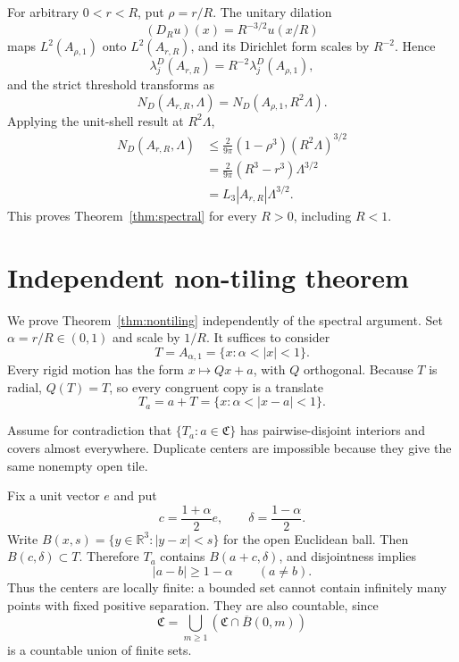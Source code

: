 \documentclass[11pt]{article}
\numberwithin{equation}{section}
\theoremstyle{definition}
\theoremstyle{remark}
\newcommand{\R}{\mathbb R}
\begin{document}
For arbitrary \(0<r<R\), put \(\rho=r/R\).  The unitary dilation
\[
  (D_Ru)(x)=R^{-3/2}u(x/R)
\]
maps \(L^2(A_{\rho,1})\) onto \(L^2(A_{r,R})\), and its Dirichlet form
scales by \(R^{-2}\).  Hence
\[
  \lambda_j^D(A_{r,R})=R^{-2}\lambda_j^D(A_{\rho,1}),
\]
and the strict threshold transforms as
\begin{equation}
  N_D(A_{r,R},\Lambda)
  =N_D(A_{\rho,1},R^2\Lambda).
  \label{eq:dilation-count}
\end{equation}
Applying the unit-shell result at \(R^2\Lambda\),
\[
\begin{aligned}
  N_D(A_{r,R},\Lambda)
  &\le\frac{2}{9\pi}(1-\rho^3)(R^2\Lambda)^{3/2}\\
  &=\frac{2}{9\pi}(R^3-r^3)\Lambda^{3/2}\\
  &=L_3|A_{r,R}|\Lambda^{3/2}.
\end{aligned}
\]
This proves Theorem~\ref{thm:spectral} for every \(R>0\), including
\(R<1\).

\appendix

\section{Independent non-tiling theorem}

We prove Theorem~\ref{thm:nontiling} independently of the spectral argument.
Set \(\alpha=r/R\in(0,1)\) and scale by \(1/R\).  It suffices to consider
\[
  T=A_{\alpha,1}=\{x:\alpha<|x|<1\}.
\]
Every rigid motion has the form \(x\mapsto Qx+a\), with \(Q\) orthogonal.
Because \(T\) is radial, \(Q(T)=T\), so every congruent copy is a translate
\[
  T_a=a+T=\{x:\alpha<|x-a|<1\}.
\]

Assume for contradiction that \(\{T_a:a\in\mathfrak C\}\) has
pairwise-disjoint interiors and covers almost everywhere.  Duplicate centers
are impossible because they give the same nonempty open tile.

Fix a unit vector \(e\) and put
\[
  c=\frac{1+\alpha}{2}e,
  \qquad
  \delta=\frac{1-\alpha}{2}.
\]
Write \(B(x,s)=\{y\in\R^3:|y-x|<s\}\) for the open Euclidean ball.
Then \(B(c,\delta)\subset T\).  Therefore \(T_a\) contains
\(B(a+c,\delta)\), and disjointness implies
\begin{equation}
  |a-b|\ge1-\alpha
  \qquad(a\ne b).
  \label{eq:center-separation}
\end{equation}
Thus the centers are locally finite: a bounded set cannot contain infinitely
many points with fixed positive separation.  They are also countable, since
\[
  \mathfrak C
  =\bigcup_{m\ge1}(\mathfrak C\cap\overline B(0,m))
\]
is a countable union of finite sets.
\end{document}
